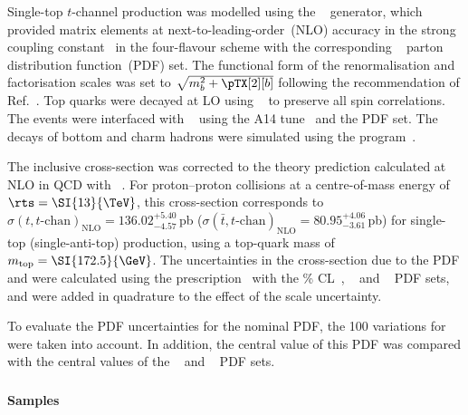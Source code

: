 Single-top $t$-channel production was modelled using the
\POWHEGBOX[v2]~\cite{Frederix:2012dh,Nason:2004rx,Frixione:2007vw,Alioli:2010xd}
generator, which provided matrix elements at next-to-leading-order~(NLO) 
accuracy in the strong coupling constant \alphas\ in the four-flavour 
scheme with the corresponding \NNPDF[3.0nlo]~\cite{Ball:2014uwa} parton
distribution function~(PDF) set.  The functional form of the
renormalisation and factorisation scales was set to
$\sqrt{m_b^2 + \pTX[2][b]}$ following the
recommendation of Ref.~\cite{Frederix:2012dh}. Top quarks were decayed at
LO using \MADSPIN~\cite{Frixione:2007zp,Artoisenet:2012st} to preserve
all spin correlations.  The events were interfaced with
\PYTHIA[8.230]~\cite{Sjostrand:2014zea} using the A14
tune~\cite{ATL-PHYS-PUB-2014-021} and the \NNPDF[2.3lo] PDF set.  
The decays of bottom and charm hadrons were simulated using the
\EVTGEN[1.6.0] program~\cite{Lange:2001uf}.

The inclusive cross-section was corrected to the theory prediction calculated at NLO in QCD with 
\HATHOR[2.1]~\cite{Aliev:2010zk,Kant:2014oha}.
For proton--proton collisions at a centre-of-mass energy of $\rts = \SI{13}{\TeV}$, this cross-section corresponds to
$\sigma(t,t\text{-chan})_\text{NLO}= 136.02^{+5.40}_{-4.57}$\,pb ($\sigma(\bar{t},t\text{-chan})_\text{NLO}=80.95^{+4.06}_{-3.61}$\,pb)
for single-top (single-anti-top) production, using a top-quark mass of $\mtop = \SI{172.5}{\GeV}$.
The uncertainties in the cross-section due to the PDF and \alphas were calculated using the \PDFforLHC prescription~\cite{Butterworth:2015oua}
with the \% CL~\cite{Martin:2009iq,Martin:2009bu}, \CT[10nlo]~\cite{Lai:2010vv} 
and \NNPDF[2.3nlo]~\cite{Ball:2012cx} PDF sets,
and were added in quadrature to the effect of the scale uncertainty.



To evaluate the PDF uncertainties for the nominal PDF, the 100 variations for \NNPDF[3.0nlo] were taken into account. 
In addition, the central value of this PDF was compared with the central values of the \CT[14nnlo]~\cite{Dulat:2015mca} 
and \MMHT[nnlo]~\cite{Harland-Lang:2014zoa} PDF sets.


\subsubsection[Powheg+Herwig7]{\POWHER[7]}
\label{subsubsec:tchan_PH7}

\paragraph{Samples}

